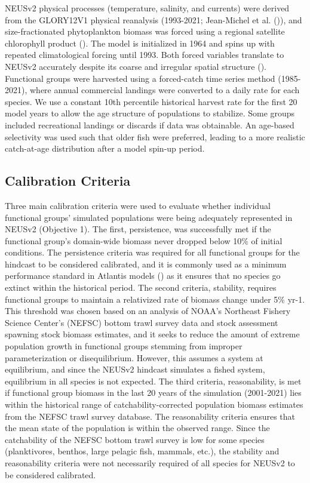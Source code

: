 \documentclass[
]{article}
\begin{document}
NEUSv2 physical processes (temperature, salinity, and currents) were derived from the GLORY12V1 physical reanalysis (1993-2021; Jean-Michel et al. ()), and size-fractionated phytoplankton biomass was forced using a regional satellite chlorophyll product (). The model is initialized in 1964 and spins up with repeated climatological forcing until 1993. Both forced variables translate to NEUSv2 accurately despite its coarse and irregular spatial structure (). Functional groups were harvested using a forced-catch time series method (1985-2021), where annual commercial landings were converted to a daily rate for each species. We use a constant 10th percentile historical harvest rate for the first 20 model years to allow the age structure of populations to stabilize. Some groups included recreational landings or discards if data was obtainable. An age-based selectivity was used such that older fish were preferred, leading to a more realistic catch-at-age distribution after a model spin-up period.

\subsection{Calibration Criteria}\label{calibration-criteria}

Three main calibration criteria were used to evaluate whether individual functional groups' simulated populations were being adequately represented in NEUSv2 (Objective 1). The first, persistence, was successfully met if the functional group's domain-wide biomass never dropped below 10\% of initial conditions. The persistence criteria was required for all functional groups for the hindcast to be considered calibrated, and it is commonly used as a minimum performance standard in Atlantis models () as it ensures that no species go extinct within the historical period. The second criteria, stability, requires functional groups to maintain a relativized rate of biomass change under 5\% yr-1. This threshold was chosen based on an analysis of NOAA's Northeast Fishery Science Center's (NEFSC) bottom trawl survey data and stock assessment spawning stock biomass estimates, and it seeks to reduce the amount of extreme population growth in functional groups stemming from improper parameterization or disequilibrium. However, this assumes a system at equilibrium, and since the NEUSv2 hindcast simulates a fished system, equilibrium in all species is not expected. The third criteria, reasonability, is met if functional group biomass in the last 20 years of the simulation (2001-2021) lies within the historical range of catchability-corrected population biomass estimates from the NEFSC trawl survey database. The reasonability criteria ensures that the mean state of the population is within the observed range. Since the catchability of the NEFSC bottom trawl survey is low for some species (planktivores, benthos, large pelagic fish, mammals, etc.), the stability and reasonability criteria were not necessarily required of all species for NEUSv2 to be considered calibrated.
\end{document}
